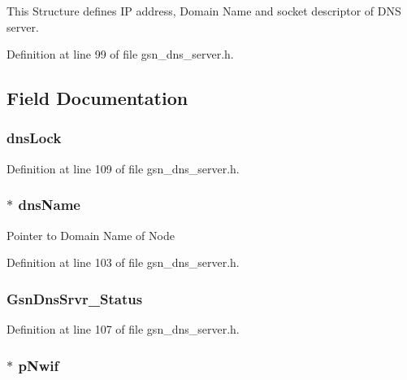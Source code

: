 This Structure defines IP address, Domain Name and socket descriptor of DNS server. 

Definition at line 99 of file gsn\_\-dns\_\-server.h.



\subsection{Field Documentation}
\hypertarget{a00055_a1bbe64de092f51bf05b4e6259a27e1d0}{
\subsubsection[{dnsLock}]{ {\bf dnsLock}}}
\label{a00055_a1bbe64de092f51bf05b4e6259a27e1d0}


Definition at line 109 of file gsn\_\-dns\_\-server.h.

\hypertarget{a00055_a7063be62a4ac374e6b6228f590720d7c}{
\subsubsection[{dnsName}]{$\ast$ {\bf dnsName}}}
\label{a00055_a7063be62a4ac374e6b6228f590720d7c}
Pointer to Domain Name of Node 

Definition at line 103 of file gsn\_\-dns\_\-server.h.

\hypertarget{a00055_a9cd77fc2426c7e03a911fa7461c60716}{
\subsubsection[{GsnDnsSrvr\_\-Status}]{ {\bf GsnDnsSrvr\_\-Status}}}
\label{a00055_a9cd77fc2426c7e03a911fa7461c60716}


Definition at line 107 of file gsn\_\-dns\_\-server.h.

\hypertarget{a00055_a98d510676ecd134a5e9ac61bf222cded}{
\subsubsection[{pNwif}]{$\ast$ {\bf pNwif}}}
\label{a00055_a98d510676ecd134a5e9ac61bf222cded}


